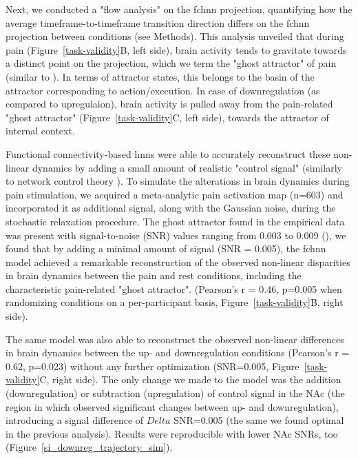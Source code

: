 \documentclass{article}
\begin{document}
Next, we conducted a "flow analysis" on the \acrshort{fchnn} projection, quantifying how the average timeframe-to-timeframe transition direction differs on the \acrshort{fchnn} projection between conditions (see Methods).
This analysis unveiled that during pain (Figure~\ref{task-validity}B, left side), brain activity tends to gravitate towards a distinct point on the projection, which we term the "ghost attractor" of pain (similar to \cite{vohryzek2020ghost}). In terms of attractor states, this belongs to the basin of the attractor corresponding to action/execution. In case of downregulation (as compared to upregulaion), brain activity is pulled away from the pain-related "ghost attractor" (Figure~\ref{task-validity}C, left side), towards the attractor of internal context.

Functional connectivity-based \acrshort{hnn}s were able to accurately reconstruct these non-linear dynamics by adding a small amount of realistic "control signal" (similarly to network control theory \citet{liu2011controllability, gu2015controllability}). To simulate the alterations in brain dynamics during pain stimulation, we acquired a meta-analytic pain activation map \citep{zunhammer2021meta} (n=603) and incorporated it as additional signal, along with the Gaussian noise, during the stochastic relaxation procedure. The ghost attractor found in the empirical data was present with signal-to-noise (SNR) values ranging from 0.003 to 0.009 (), we found that by adding a minimal amount of signal (SNR = 0.005), the \acrshort{fchnn} model achieved a remarkable reconstruction of the observed non-linear disparities in brain dynamics between the pain and rest conditions, including the characteristic pain-related "ghost attractor". (Pearson's r = 0.46, p=0.005 when randomizing conditions on a per-participant basis, Figure~\ref{task-validity}B, right side).

The same model was also able to reconstruct the observed non-linear differences in brain dynamics between the up- and downregulation conditions (Pearson's r = 0.62, p=0.023) without any further optimization (SNR=0.005,
Figure~\ref{task-validity}C, right side). The only change we made to the model was the addition (downregulation) or
subtraction (upregulation) of control signal in the NAc (the region in which \citep{woo2015distinct} observed significant changes between up- and downregulation), introducing a signal difference of $Delta$ SNR=0.005 (the same we found optimal in the previous analysis). Results were reproducible with lower NAc SNRs, too (Figure~\ref{si_downreg_trajectory_sim}).
\end{document}
